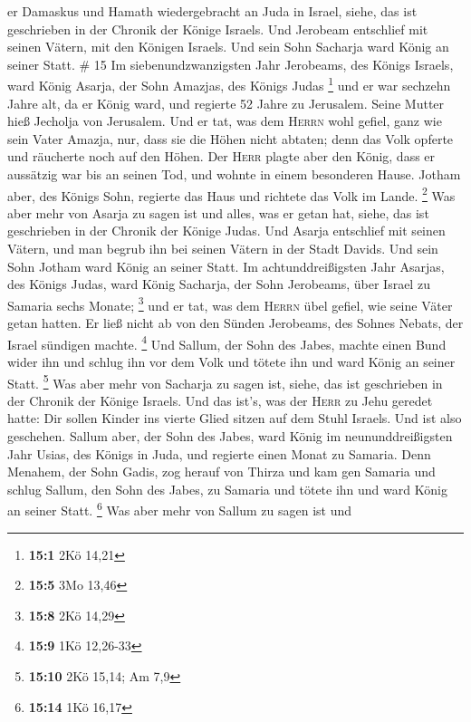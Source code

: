 er Damaskus und Hamath wiedergebracht an Juda in Israel, siehe, das ist
geschrieben in der Chronik der Könige Israels.  Und
Jerobeam entschlief mit seinen Vätern, mit den Königen Israels. Und sein
Sohn Sacharja ward König an seiner Statt. \# 15  Im
siebenundzwanzigsten Jahr Jerobeams, des Königs Israels, ward König
Asarja, der Sohn Amazjas, des Königs Judas \footnote{\textbf{15:1} 2Kö
  14,21}  und er war sechzehn Jahre alt, da er König ward,
und regierte 52 Jahre zu Jerusalem. Seine Mutter hieß Jecholja von
Jerusalem.  Und er tat, was dem \textsc{Herrn} wohl
gefiel, ganz wie sein Vater Amazja,  nur, dass sie die
Höhen nicht abtaten; denn das Volk opferte und räucherte noch auf den
Höhen.  Der \textsc{Herr} plagte aber den König, dass er
aussätzig war bis an seinen Tod, und wohnte in einem besonderen Hause.
Jotham aber, des Königs Sohn, regierte das Haus und richtete das Volk im
Lande. \footnote{\textbf{15:5} 3Mo 13,46}  Was aber mehr
von Asarja zu sagen ist und alles, was er getan hat, siehe, das ist
geschrieben in der Chronik der Könige Judas.  Und Asarja
entschlief mit seinen Vätern, und man begrub ihn bei seinen Vätern in
der Stadt Davids. Und sein Sohn Jotham ward König an seiner Statt.
 Im achtunddreißigsten Jahr Asarjas, des Königs Judas,
ward König Sacharja, der Sohn Jerobeams, über Israel zu Samaria sechs
Monate; \footnote{\textbf{15:8} 2Kö 14,29}  und er tat,
was dem \textsc{Herrn} übel gefiel, wie seine Väter getan hatten. Er
ließ nicht ab von den Sünden Jerobeams, des Sohnes Nebats, der Israel
sündigen machte. \footnote{\textbf{15:9} 1Kö 12,26-33} 
Und Sallum, der Sohn des Jabes, machte einen Bund wider ihn und schlug
ihn vor dem Volk und tötete ihn und ward König an seiner Statt.
\footnote{\textbf{15:10} 2Kö 15,14; Am 7,9}  Was aber
mehr von Sacharja zu sagen ist, siehe, das ist geschrieben in der
Chronik der Könige Israels.  Und das ist's, was der
\textsc{Herr} zu Jehu geredet hatte: Dir sollen Kinder ins vierte Glied
sitzen auf dem Stuhl Israels. Und ist also geschehen. 
Sallum aber, der Sohn des Jabes, ward König im neununddreißigsten Jahr
Usias, des Königs in Juda, und regierte einen Monat zu Samaria.
 Denn Menahem, der Sohn Gadis, zog herauf von Thirza und
kam gen Samaria und schlug Sallum, den Sohn des Jabes, zu Samaria und
tötete ihn und ward König an seiner Statt. \footnote{\textbf{15:14} 1Kö
  16,17}  Was aber mehr von Sallum zu sagen ist und
